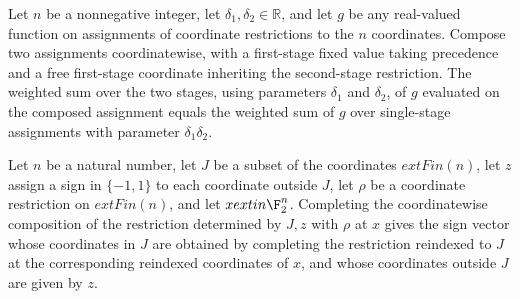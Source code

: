 \begin{theorem}
\label{FABL.sum_restrictionAssignmentWeightAt_compose}
\leanok
{}
Let $n$ be a nonnegative integer, let $\delta_1,\delta_2\in\mathbb R$, and let $g$ be
any real-valued function on assignments of coordinate restrictions to the $n$
coordinates. Compose two assignments coordinatewise, with a first-stage fixed value
taking precedence and a free first-stage coordinate inheriting the second-stage
restriction. The weighted sum over the two stages, using parameters $\delta_1$ and
$\delta_2$, of $g$ evaluated on the composed assignment equals the weighted sum of $g$
over single-stage assignments with parameter $\delta_1\delta_2$.
\end{theorem}

\begin{theorem}
\label{FABL.complete_compose_coordRestrictionOf}
\leanok
{}
Let $n$ be a natural number, let $J$ be a subset of the coordinates $	ext{Fin}(n)$, let
$z$ assign a sign in $\{-1,1\}$ to each coordinate outside $J$, let $\rho$ be a
coordinate restriction on $	ext{Fin}(n)$, and let $x	ext{in }\F_2^n$. Completing the
coordinatewise composition of the restriction determined by $J,z$ with $\rho$ at $x$
gives the sign vector whose coordinates in $J$ are obtained by completing the
restriction reindexed to $J$ at the corresponding reindexed coordinates of $x$, and
whose coordinates outside $J$ are given by $z$.
\end{theorem}

